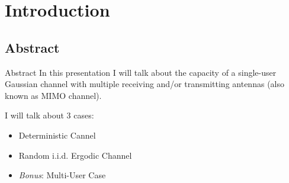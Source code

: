 \section{Introduction}

\subsection{Abstract}
\begin{frame}{Abstract}
In this presentation I will talk about the capacity of a single-user Gaussian channel with multiple receiving and/or transmitting antennas \cite{telatar99} (also known as \alert{MIMO} channel).

\myspace
I will talk about 3 cases:
\begin{itemize}
	\item Deterministic Cannel
	\item Random i.i.d. Ergodic Channel
	\item \textit{Bonus}: Multi-User Case
\end{itemize}

\end{frame}

